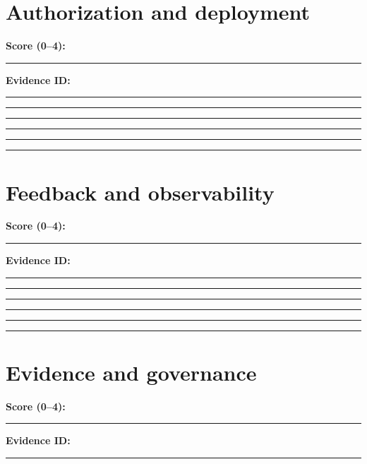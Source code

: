 \documentclass[11pt,letterpaper]{article}
\begin{document}
\section{Authorization and deployment}
\noindent\textbf{Score (0--4):}\hspace{1.5cm}\rule{2cm}{0.4pt}\quad\textbf{Evidence ID:}\rule{4cm}{0.4pt}

\vspace{2mm}
\noindent\rule{0.93\linewidth}{0.4pt}\par\vspace{13pt}
\noindent\rule{0.93\linewidth}{0.4pt}\par\vspace{13pt}
\noindent\rule{0.93\linewidth}{0.4pt}\par\vspace{13pt}
\noindent\rule{0.93\linewidth}{0.4pt}\par\vspace{13pt}
\noindent\rule{0.93\linewidth}{0.4pt}\par\vspace{13pt}
\section{Feedback and observability}
\noindent\textbf{Score (0--4):}\hspace{1.5cm}\rule{2cm}{0.4pt}\quad\textbf{Evidence ID:}\rule{4cm}{0.4pt}

\vspace{2mm}
\noindent\rule{0.93\linewidth}{0.4pt}\par\vspace{13pt}
\noindent\rule{0.93\linewidth}{0.4pt}\par\vspace{13pt}
\noindent\rule{0.93\linewidth}{0.4pt}\par\vspace{13pt}
\noindent\rule{0.93\linewidth}{0.4pt}\par\vspace{13pt}
\noindent\rule{0.93\linewidth}{0.4pt}\par\vspace{13pt}
\section{Evidence and governance}
\noindent\textbf{Score (0--4):}\hspace{1.5cm}\rule{2cm}{0.4pt}\quad\textbf{Evidence ID:}\rule{4cm}{0.4pt}
\end{document}
